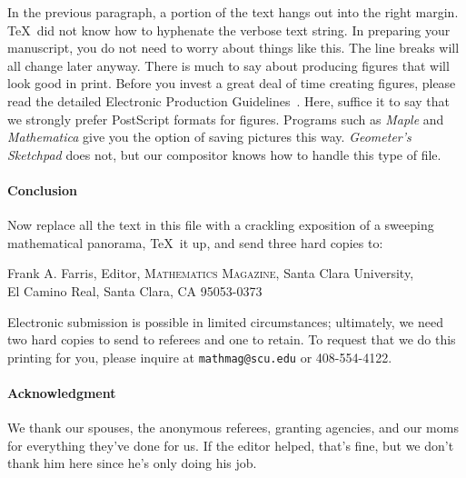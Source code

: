 \documentclass[12pt]{article}
\begin{document}
In the previous paragraph, a portion of the
text hangs out into the right margin.  \TeX\ did not
know how to hyphenate the verbose text string.  In
preparing your manuscript, you do not need to worry about
things like this.  The line breaks will all change later anyway.
There is much to say about producing figures that will
look good in print.  Before you invest a great deal of time
creating figures, please read the detailed Electronic
Production Guidelines~\cite{MAA}.  Here, suffice it to say
that we strongly prefer PostScript formats for figures.
Programs such as \textit{Maple} and \textit{Mathematica}
give you the option of saving pictures this way.  \textit{Geometer's Sketchpad} does not,
but our compositor knows
how to handle this type of file.

\paragraph*{Conclusion}
Now replace all the text in this file with a crackling exposition of
a sweeping mathematical panorama, \TeX\ it up, and send three hard copies to:
\vskip 3mm

\noindent Frank A. Farris, Editor, \textsc{Mathematics Magazine}, Santa Clara University,\\
 El Camino Real, Santa Clara, CA 95053-0373
\vskip 3mm

Electronic submission is possible in limited circumstances;
ultimately, we need two hard copies to send to referees and one to
retain.  To request that we do this printing for you, please inquire
at \verb+mathmag@scu.edu+ or 408-554-4122.

\paragraph*{Acknowledgment}
We thank our spouses, the anonymous referees, granting agencies, and our moms
for everything they've done for us.    If the editor
helped, that's fine, but we don't thank him here
since he's only doing his job.
\end{document}
